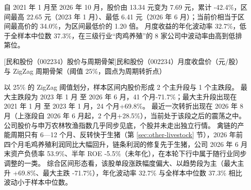  自 2021 年 1 月至 2026 年 10 月，股价由 13.34 元变为 7.69 元，累计 -42.4\%，区间最高 22.65 元（2023 年 1 月）、最低 6.41 元（2026 年 6 月）；当前价相当于区间最高价的 34.0\%，为区间最低价的 1.20 倍。 月度收益的年化波动率 32.7\%，低于全样本中位数 37.3\%，在三级行业“肉鸡养殖”的 8 家公司中波动率由高到低排第位。

\begin{center}
\begin{minipage}{\textwidth}\centering
{}

[民和股份（002234）股价与周期骨架]{民和股份（002234）月度收盘价（元/股）与 ZigZag 周期骨架（阈值 25\%，圆点为周期转折点）}
\end{minipage}
\end{center}

 以 25\% 的 ZigZag 阈值划分，样本区间内股价形成 2 个主升段与 1 个主跌段。 最大主跌段为 2023 年 1 月 至 2026 年 6 月，41 个月-71.7\%；最大主升段出现在 2021 年 1 月 至 2023 年 1 月，24 个月+69.8\%。 最近一次转折出现在 2026 年 8 月（上涨段自 2026 年 6 月起，2 个月+28.5\%），当前处于该段之后的震荡之中。 公司股价与申万农林牧渔指数几乎同步见底，个股并未走出独立行情。 禽链的产能周期只有 6---12 个月、反转快于生猪（第 \ref{sec:other-livestock} 节），2026 年前四个月毛鸡养殖利润同比大幅回升，链条利润的修复先于生猪，公司 2026 年 6 月末资产负债率 53.9\%、半年 ROE -5.5\%（未年化），在本轮下行中属于随行业同步调整的一类。 综合区间形态看，该股单段涨跌幅度偏大、以趋势段为主（最大主升 +69.8\%、最大主跌 -71.7\%），年化波动率 32.7\% 与全样本中位数 37.3\% 相比波动小于样本中位数。

